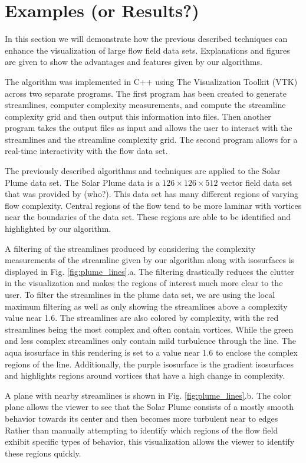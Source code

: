 \documentclass{egpubl}
\begin{document}
\section{Examples (or Results?)} \label{sec:examples}

In this section we will demonstrate how the previous described techniques can enhance the visualization of large flow field data sets.
Explanations and figures are given to show the advantages and features given by our algorithms.

The algorithm was implemented in C++ using The Visualization Toolkit (VTK) across two separate programs.
The first program has been created to generate streamlines, computer complexity measurements, and compute the streamline complexity grid and then output this information into files.
Then another program takes the output files as input and allows the user to interact with the streamlines and the streamline complexity grid.
The second program allows for a real-time interactivity with the flow data set.

The previously described algorithms and techniques are applied to the Solar Plume data set.
The Solar Plume data is a $126 \times 126 \times 512$ vector field data set that was provided by (who?).
This data set has many different regions of varying flow complexity.
Central regions of the flow tend to be more laminar with vortices near the boundaries of the data set.
These regions are able to be identified and highlighted by our algorithm.

A filtering of the streamlines produced by considering the complexity measurements of the streamline given by our algorithm along with isosurfaces is displayed in Fig. \ref{fig:plume_lines}.a.
The filtering drastically reduces the clutter in the visualization and makes the regions of interest much more clear to the user.
To filter the streamlines in the plume data set, we are using the local maximum filtering as well as only showing the streamlines above a complexity value near 1.6.
The streamlines are also colored by complexity, with the red streamlines being the most complex and often contain vortices.
While the green and less complex streamlines only contain mild turbulence through the line.
The aqua isosurface in this rendering is set to a value near 1.6 to enclose the complex regions of the line.
Additionally, the purple isosurface is the gradient isosurfaces and highlights regions around vortices that have a high change in complexity.

A plane with nearby streamlines is shown in Fig. \ref{fig:plume_lines}.b.
The color plane allows the viewer to see that the Solar Plume consists of a mostly smooth behavior towards its center and then becomes more turbulent near to edges
Rather than manually attempting to identify which regions of the flow field exhibit specific types of behavior, this visualization allows the viewer to identify these regions quickly.
\end{document}
